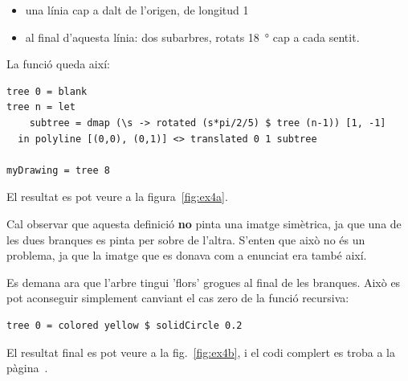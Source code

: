 \documentclass[catalan, a4paper]{scrartcl}
\begin{document}
\begin{itemize}
\item una línia cap a dalt de l'origen, de longitud 1
\item al final d'aquesta línia: dos subarbres,
  rotats \SI{18}{\degree} cap a cada sentit.
\end{itemize}

La funció queda així:

\begin{verbatim}
tree 0 = blank
tree n = let
    subtree = dmap (\s -> rotated (s*pi/2/5) $ tree (n-1)) [1, -1]
  in polyline [(0,0), (0,1)] <> translated 0 1 subtree

myDrawing = tree 8
\end{verbatim}

El resultat es pot veure a la figura~\ref{fig:ex4a}.

Cal observar que aquesta definició \textbf{no} pinta una imatge
simètrica, ja que una de les dues branques es pinta per sobre
de l'altra. S'enten que això no és un problema, ja que la imatge
que es donava com a enunciat era també així.

Es demana ara que l'arbre tingui 'flors' grogues al final de les
branques. Això es pot aconseguir simplement canviant el cas zero
de la funció recursiva:

\begin{verbatim}
tree 0 = colored yellow $ solidCircle 0.2
\end{verbatim}

El resultat final es pot veure a la fig.~\ref{fig:ex4b}, i el codi complert
es troba a la pàgina~\pageref{code-ex4}.
\end{document}

